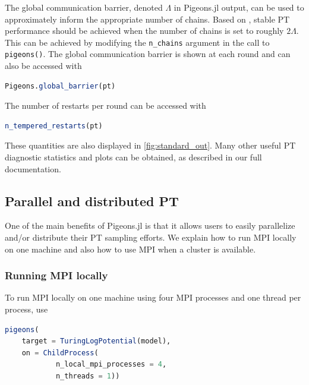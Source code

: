  
The global communication barrier, denoted $\Lambda$ in Pigeons.jl output, can be 
used to approximately inform the appropriate number of chains. 
Based on \citet{syed2021nrpt}, stable PT performance should be achieved when  
the number of chains is set to roughly $2\Lambda$. This can be achieved by 
modifying the \texttt{n\_chains} argument in the call to \texttt{pigeons()}. 
The global communication barrier is shown at each round and can also be accessed 
with 
\begin{lstlisting}[language=Julia]
Pigeons.global_barrier(pt)
\end{lstlisting}

The number of restarts per round can be accessed with 
\begin{lstlisting}[language=Julia]
n_tempered_restarts(pt)
\end{lstlisting}
These quantities are also displayed in \cref{fig:standard_out}. 
Many other useful PT diagnostic statistics and plots can be obtained, as described 
in our full documentation. 


\subsection{Parallel and distributed PT}
One of the main benefits of Pigeons.jl is that it allows users to easily parallelize 
and/or distribute their PT sampling efforts. We explain how to run MPI locally on 
one machine and also how to use MPI when a cluster is available.

\subsubsection{Running MPI locally}
To run MPI locally on one machine using four MPI processes and one thread per process,
use
\begin{lstlisting}[language = Julia]
pigeons(
    target = TuringLogPotential(model), 
    on = ChildProcess(
            n_local_mpi_processes = 4,
            n_threads = 1))
\end{lstlisting}

